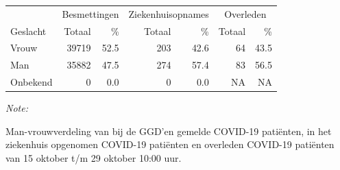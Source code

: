 \documentclass[
  english,
  man,floatsintext]{apa6}
\begin{document}
\begin{table}
\centering\begingroup\fontsize{11}{13}\selectfont

\begin{threeparttable}
\begin{tabular}{lrrrrrr}
\toprule
\multicolumn{1}{c}{ } & \multicolumn{2}{c}{Besmettingen} & \multicolumn{2}{c}{Ziekenhuisopnames} & \multicolumn{2}{c}{Overleden} \\
\cmidrule(l{3pt}r{3pt}){2-3} \cmidrule(l{3pt}r{3pt}){4-5} \cmidrule(l{3pt}r{3pt}){6-7}
Geslacht & Totaal & \% & Totaal & \% & Totaal & \%\\
\midrule
Vrouw & 39719 & 52.5 & 203 & 42.6 & 64 & 43.5\\
Man & 35882 & 47.5 & 274 & 57.4 & 83 & 56.5\\
Onbekend & 0 & 0.0 & 0 & 0.0 & NA & NA\\
\bottomrule
\end{tabular}
\begin{tablenotes}
\item \textit{Note: } 
\item Man-vrouwverdeling van bij de GGD’en gemelde COVID-19 patiënten, in het ziekenhuis opgenomen COVID-19 patiënten en overleden COVID-19 patiënten van 15 oktober t/m 29 oktober 10:00 uur.
\end{tablenotes}
\end{threeparttable}
\endgroup{}
\end{table}
\newpage
\end{document}
